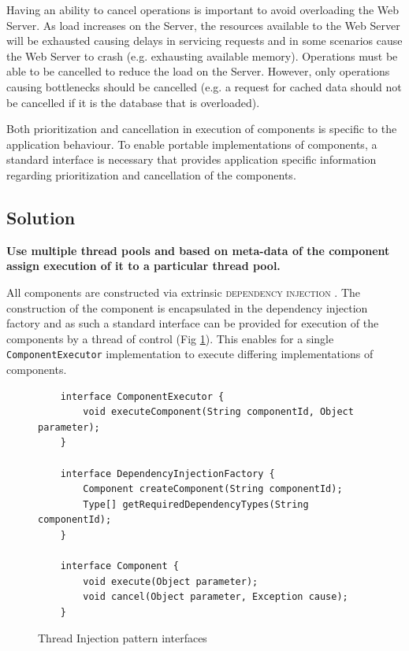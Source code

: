 \documentclass[prodmode]{style/acmlarge}
\begin{document}
Having an ability to cancel operations is important to avoid overloading the Web
Server.  As load increases on the Server, the resources available to the Web
Server will be exhausted causing delays in servicing requests and in some
scenarios cause the Web Server to crash (e.g. exhausting available memory). 
Operations must be able to be cancelled to reduce the load on the Server. 
However, only operations causing bottlenecks should be cancelled (e.g. a request
for cached data should not be cancelled if it is the database that is
overloaded).

Both prioritization and cancellation in execution of components is specific to
the application behaviour.  To enable portable implementations of components, a
standard interface is necessary that provides application specific information
regarding prioritization and cancellation of the components.


\subsection{Solution}

\textbf{Use multiple thread pools and based on meta-data of the component assign execution of it to a particular thread pool.}

All components are constructed via extrinsic \textsc{dependency injection}
\cite{ioc}.  The construction of the component is encapsulated in the dependency
injection factory and as such a standard interface can be provided for execution
of the components by a thread of control (Fig
\ref{fig:ThreadInjectionInterfaces}).  This enables for a single
\texttt{ComponentExecutor} implementation to execute differing implementations
of components.

\begin{figure}[tp]
\centering
\begin{verbatim}
    interface ComponentExecutor {
        void executeComponent(String componentId, Object parameter);
    }

    interface DependencyInjectionFactory {
        Component createComponent(String componentId);
        Type[] getRequiredDependencyTypes(String componentId);
    }

    interface Component {
        void execute(Object parameter); 
        void cancel(Object parameter, Exception cause);
    }
\end{verbatim}
\caption{Thread Injection pattern interfaces\footnotemark}
\label{fig:ThreadInjectionInterfaces}
\end{figure}
\end{document}
